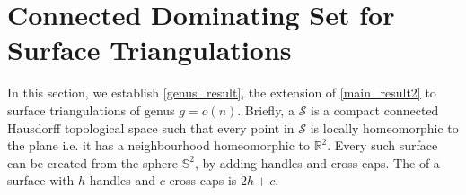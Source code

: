 \section{Connected Dominating Set for Surface Triangulations}
\label{bounded_genus}
In this section, we establish \cref{genus_result}, the extension of \cref{main_result2} to surface triangulations of genus $g = o(n)$.
Briefly, a  $\mathcal{S}$ is a compact connected Hausdorff topological space such that every point in $\mathcal{S}$ is locally homeomorphic to the plane i.e. it has a neighbourhood homeomorphic to $\mathbb{R}^2$. Every such surface can be created from the sphere $\mathbb{S}^2$, by adding handles and cross-caps. The  of a surface with $h$ handles and $c$ cross-caps is $2h+c$.


